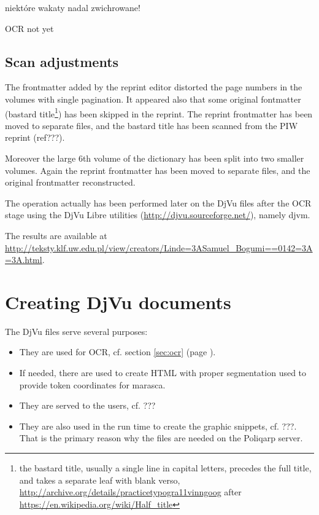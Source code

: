 \documentclass{article}
\begin{document}
niektóre wakaty nadal zwichrowane!

OCR not yet

\subsection{Scan adjustments}
\label{sec:scan-adjustments}

The frontmatter added by the reprint editor distorted the page numbers
in the volumes with single pagination. It appeared also that some
original fontmatter (bastard title\footnote{the bastard title, usually
  a single line in capital letters, precedes the full title, and takes
  a separate leaf with blank verso,
  \url{http://archive.org/details/practicetypogra11vinngoog} after
  \url{https://en.wikipedia.org/wiki/Half_title}}) has been skipped in
the reprint. The reprint frontmatter has been moved to separate files,
and the bastard title has been scanned from the PIW reprint (ref???).

Moreover the large 6th volume of the dictionary has been split into
two smaller volumes. Again the reprint frontmatter has been moved to
separate files, and the original frontmatter reconstructed.

The operation actually has been performed later on the DjVu files
after the OCR stage using the DjVu Libre utilities
(\url{http://djvu.sourceforge.net/}), namely djvm.

The results are available at
\url{http://teksty.klf.uw.edu.pl/view/creators/Linde=3ASamuel_Bogumi==0142=3A=3A.html}.

\section{Creating DjVu documents}
\label{sec:creat-djvu-docum}

The DjVu files serve several purposes:

\begin{itemize}
\item They are used for OCR, cf. section \ref{sec:ocr} (page \pageref{sec:ocr}).
\item If needed, there are used to create HTML with proper
  segmentation used to provide token coordinates for marasca.
\item They are served to the users, cf. ???
\item They are also used in the run time to create the graphic
  snippets, cf. ???. That is the primary reason why the files are
  needed on the Poliqarp server.
\end{itemize}
\end{document}

